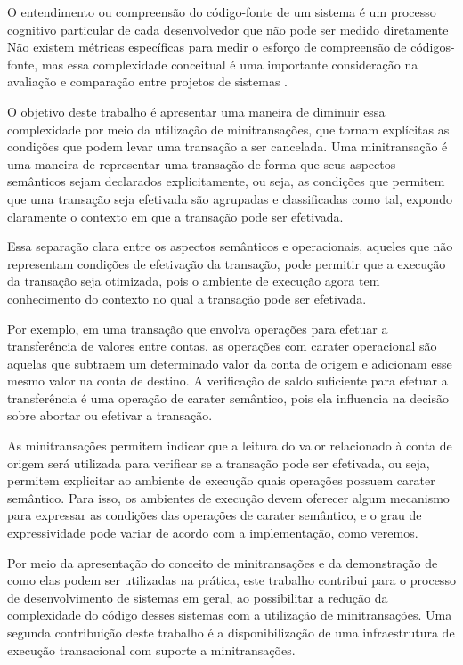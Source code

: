 \documentclass[11pt,twoside,a4paper]{book}
\begin{document}
O entendimento ou compreensão do código-fonte de um sistema é um processo cognitivo particular de cada desenvolvedor que não pode ser medido diretamente \cite{program_comprehension}
Não existem métricas específicas para medir o esforço de compreensão de códigos-fonte, mas essa complexidade conceitual é uma importante consideração na avaliação e comparação entre projetos de sistemas \cite{software_measurement}.

O objetivo deste trabalho é apresentar uma maneira de diminuir essa complexidade por meio da utilização de minitransações, que tornam explícitas as condições que podem levar uma transação a ser cancelada. Uma minitransação é uma maneira de representar uma transação de forma que seus aspectos semânticos sejam declarados explicitamente, ou seja, as condições que permitem que uma transação seja efetivada são agrupadas e classificadas como tal, expondo claramente o contexto em que a transação pode ser efetivada.

Essa separação clara entre os aspectos semânticos e operacionais, aqueles que não representam condições de efetivação da transação, pode permitir que a execução da transação seja otimizada, pois o ambiente de execução agora tem conhecimento do contexto no qual a transação pode ser efetivada.

Por exemplo, em uma transação que envolva operações para efetuar a transferência de valores entre contas, as operações com carater operacional são aquelas que subtraem um determinado valor da conta de origem e adicionam esse mesmo valor na conta de destino. A verificação de saldo suficiente para efetuar a transferência é uma operação de carater semântico, pois ela influencia na decisão sobre abortar ou efetivar a transação.

As minitransações permitem indicar que a leitura do valor relacionado à conta de origem será utilizada para verificar se a transação pode ser efetivada, ou seja, permitem explicitar ao ambiente de execução quais operações possuem carater semântico. Para isso, os ambientes de execução devem oferecer algum mecanismo para expressar as condições das operações de carater semântico, e o grau de expressividade pode variar de acordo com a implementação, como veremos.

Por meio da apresentação do conceito de minitransações e da demonstração de como elas podem ser utilizadas na prática, este trabalho contribui para o processo de desenvolvimento de sistemas em geral, ao possibilitar a redução da complexidade do código desses sistemas com a utilização de minitransações. Uma segunda contribuição deste trabalho é a disponibilização de uma infraestrutura de execução transacional com suporte a minitransações.
\end{document}
